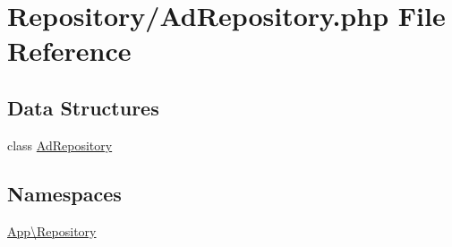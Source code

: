 \hypertarget{_ad_repository_8php}{}\section{Repository/\+Ad\+Repository.php File Reference}
\label{_ad_repository_8php}
\subsection*{Data Structures}
\begin{DoxyCompactItemize}
\item 
class \mbox{\hyperlink{class_app_1_1_repository_1_1_ad_repository}{Ad\+Repository}}
\end{DoxyCompactItemize}
\subsection*{Namespaces}
\begin{DoxyCompactItemize}
\item 
 \mbox{\hyperlink{namespace_app_1_1_repository}{App\textbackslash{}\+Repository}}
\end{DoxyCompactItemize}
